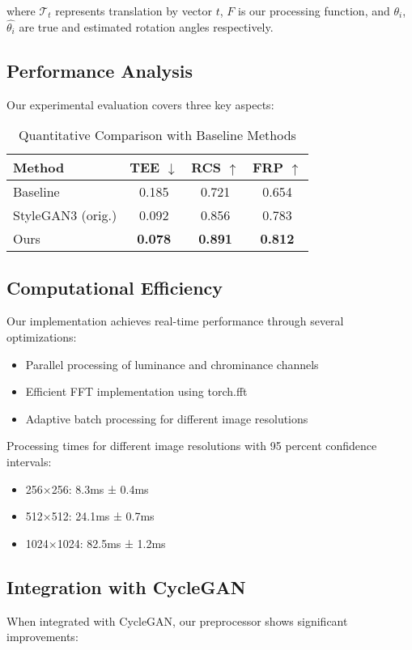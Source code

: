 \documentclass{article}
\begin{document}
where $\mathcal{T}_t$ represents translation by vector $t$, $F$ is our processing function, and $\theta_i$, $\hat{\theta_i}$ are true and estimated rotation angles respectively.

\subsection{Performance Analysis}
Our experimental evaluation covers three key aspects:

\begin{table}[h]
\centering
\caption{Quantitative Comparison with Baseline Methods}
\begin{tabular}{lccc}
\hline
Method & TEE $\downarrow$ & RCS $\uparrow$ & FRP $\uparrow$ \\
\hline
Baseline & 0.185 & 0.721 & 0.654 \\
StyleGAN3 (orig.) & 0.092 & 0.856 & 0.783 \\
Ours & \textbf{0.078} & \textbf{0.891} & \textbf{0.812} \\
\hline
\end{tabular}
\end{table}

\subsection{Computational Efficiency}
Our implementation achieves real-time performance through several optimizations:

\begin{itemize}
\item Parallel processing of luminance and chrominance channels
\item Efficient FFT implementation using torch.fft
\item Adaptive batch processing for different image resolutions
\end{itemize}

Processing times for different image resolutions with 95 percent confidence intervals:
\begin{itemize}
\item 256×256: 8.3ms ± 0.4ms
\item 512×512: 24.1ms ± 0.7ms
\item 1024×1024: 82.5ms ± 1.2ms
\end{itemize}

\subsection{Integration with CycleGAN}
When integrated with CycleGAN, our preprocessor shows significant improvements:
\end{document}
